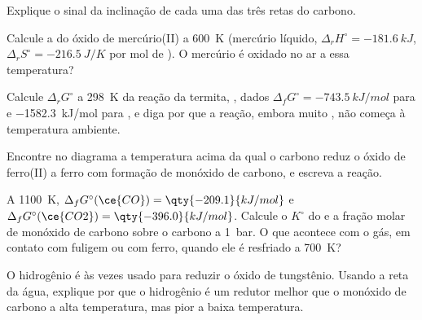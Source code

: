 \begin{exercise}[$\star$]\label{exo:b2:ellingham:4}
Explique o sinal da inclinação de cada uma das três retas do carbono.
\end{exercise}

\begin{exercise}[$\star\star$]\label{exo:b2:ellingham:5}
Calcule a  do óxido de mercúrio(II) a \qty{600}{K}
(mercúrio líquido, $\Delta_r H^\circ = \qty{-181.6}{kJ}$, $\Delta_r S^\circ =
\qty{-216.5}{J/K}$ por mol de ). O mercúrio é oxidado no ar a essa
temperatura?
\end{exercise}

\begin{exercise}[$\star\star$]\label{exo:b2:ellingham:6}
Calcule $\Delta_r G^\circ$ a \qty{298}{K} da reação da termita, , dados $\Delta_f G^\circ = \qty{-743.5}{kJ/mol}$ para
 e \qty{-1582.3}{kJ/mol} para , e diga por que a reação,
embora muito , não começa à temperatura ambiente.
\end{exercise}

\begin{exercise}[$\star\star$]\label{exo:b2:ellingham:7}
Encontre no diagrama a temperatura acima da qual o carbono reduz o óxido de
ferro(II) a ferro com formação de monóxido de carbono, e escreva a reação.
\end{exercise}

\begin{exercise}[$\star\star$]\label{exo:b2:ellingham:8}
A \qty{1100}{K}, $\Delta_f G^\circ(\ce{CO}) = \qty{-209.1}{kJ/mol}$ e
$\Delta_f G^\circ(\ce{CO2}) = \qty{-396.0}{kJ/mol}$. Calcule o $K^\circ$ do
 e a fração molar de monóxido de carbono sobre o
carbono a \qty{1}{bar}. O que acontece com o gás, em contato com fuligem ou
com ferro, quando ele é resfriado a \qty{700}{K}?
\end{exercise}

\begin{exercise}[$\star\star$]\label{exo:b2:ellingham:9}
O hidrogênio é às vezes usado para reduzir o óxido de tungstênio. Usando a reta
da água, explique por que o hidrogênio é um redutor melhor que o monóxido de
carbono a alta temperatura, mas pior a baixa temperatura.
\end{exercise}

